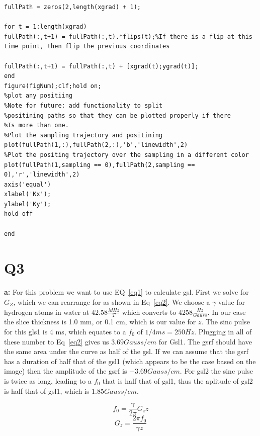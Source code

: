 \documentclass[12pt]{article}
\begin{document}
\begin{lstlisting}[style=Matlab-editor]
fullPath = zeros(2,length(xgrad) + 1);

for t = 1:length(xgrad)
fullPath(:,t+1) = fullPath(:,t).*flips(t);%If there is a flip at this time point, then flip the previous coordinates

fullPath(:,t+1) = fullPath(:,t) + [xgrad(t);ygrad(t)];
end
figure(figNum);clf;hold on;
%plot any positiing
%Note for future: add functionality to split
%positining paths so that they can be plotted properly if there
%Is more than one.
%Plot the sampling trajectory and positining
plot(fullPath(1,:),fullPath(2,:),'b','linewidth',2)
%Plot the positing trajectory over the sampling in a different color
plot(fullPath(1,sampling == 0),fullPath(2,sampling == 0),'r','linewidth',2)
axis('equal')
xlabel('Kx');
ylabel('Ky');
hold off

end
\end{lstlisting}

\section{Q3}
\noindent\textbf{a: }
For this problem we want to use EQ~\ref{eq1} to calculate gsl. First we solve for $G_Z$, which we can rearrange for as shown in Eq~\ref{eq2}. We choose a $\gamma$ value for hydrogen atoms in water at $42.58 \frac{MHz}{T}$ which converts to $4258 \frac{Hz}{Gauss}$. In our case the slice thickness is 1.0 mm, or 0.1 cm, which is our value for $z$. The sinc pulse for this gls1  is 4 ms, which equates to a $f_0$ of $1/4ms = 250 Hz$. Plugging in all of these number to Eq~\ref{eq2} gives us $3.69 Gauss/cm$ for Gsl1. The gsrf should have the same area under the curve as half of the gsl. If we can assume that the gsrf has a duration of half that of the gsl1 (which appears to be the case based on the image) then the amplitude of the gsrf is $-3.69 Gauss/cm$. For gsl2 the sinc pulse is twice as long, leading to a $f_0$ that is half that of gsl1, thus the aplitude of gsl2 is half that of gsl1, which is $1.85 Gauss/cm$.

\begin{equation}
f_0 = \frac{\gamma}{2\pi}G_zz
\label{eq1}
\end{equation}
\begin{equation}
G_z = \frac{2\pi f_0}{\gamma z}
\label{eq2}
\end{equation}
\end{document}
